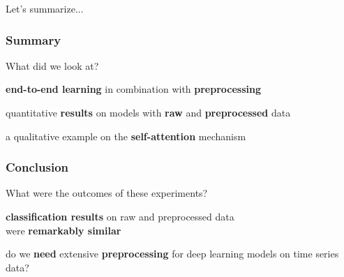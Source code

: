 \documentclass[%
  aspectratio=169,
  9pt,
  USenglish,
  light,
  mathserif,
  professionalfont,
  affiliationintitlepagehead,
  titlegraphic,
   affiliation,
]{beamer}
\begin{document}
{


{
	\begin{frame}[plain]
	
	\vspace{8em}
	\begin{center}
		\Huge\color{white}
		Let's summarize...
	\end{center}\color{white}
	
\end{frame}
}

\begin{frame}
\frametitle{Summary}
\Large 

\begin{leftbubbles}
	What did we look at?
\end{leftbubbles}

\pause
\begin{rightbubbles}
	\textbf{end-to-end learning} in combination with \textbf{preprocessing}
\end{rightbubbles}

\pause
\begin{rightbubbles}
	quantitative \textbf{results} on models with \textbf{raw} and \textbf{preprocessed} data
\end{rightbubbles}

\pause
\begin{rightbubbles}
	a qualitative example on the \textbf{self-attention} mechanism
\end{rightbubbles}

\end{frame}

\begin{frame}
\frametitle{Conclusion}
\Large 

\begin{leftbubbles}
	What were the outcomes of these experiments?
\end{leftbubbles}

\pause
\begin{rightbubbles}
	\textbf{classification results} on raw and preprocessed data \\ were \textbf{remarkably similar}
\end{rightbubbles}

\pause
\begin{rightbubbles}
	do we \textbf{need} extensive \textbf{preprocessing} for deep learning models on time series data?
\end{rightbubbles}


\end{frame}}
\end{document}
